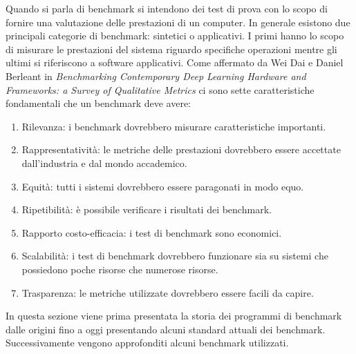 \documentclass[12pt, a4paper]{report}
\begin{document}
Quando si parla di benchmark si intendono dei test di prova con lo scopo di fornire una valutazione delle prestazioni di un computer. In generale esistono due principali categorie di benchmark: sintetici o applicativi. I primi hanno lo scopo di misurare le prestazioni del sistema riguardo specifiche operazioni mentre gli ultimi si riferiscono a software applicativi. Come affermato da Wei Dai e Daniel Berleant in \textit{Benchmarking Contemporary Deep Learning Hardware and Frameworks: a Survey of Qualitative Metrics }\cite{benchmarkIntro} ci sono sette caratteristiche fondamentali che un benchmark deve avere:
\begin{enumerate}
 \item Rilevanza: i benchmark dovrebbero misurare caratteristiche importanti.
 \item Rappresentatività: le metriche delle prestazioni dovrebbero essere accettate dall'industria e dal mondo accademico.
 \item Equità: tutti i sistemi dovrebbero essere paragonati in modo equo.
 \item Ripetibilità: è possibile verificare i risultati dei benchmark.
 \item Rapporto costo-efficacia: i test di benchmark sono economici.
 \item Scalabilità: i test di benchmark dovrebbero funzionare sia su sistemi che possiedono poche risorse che numerose risorse.
 \item Trasparenza: le metriche utilizzate dovrebbero essere facili da capire.
\end{enumerate}
In questa sezione viene prima presentata la storia dei programmi di benchmark dalle origini fino a oggi presentando alcuni standard attuali dei benchmark. Successivamente vengono approfonditi alcuni benchmark utilizzati.

 
\end{document}
